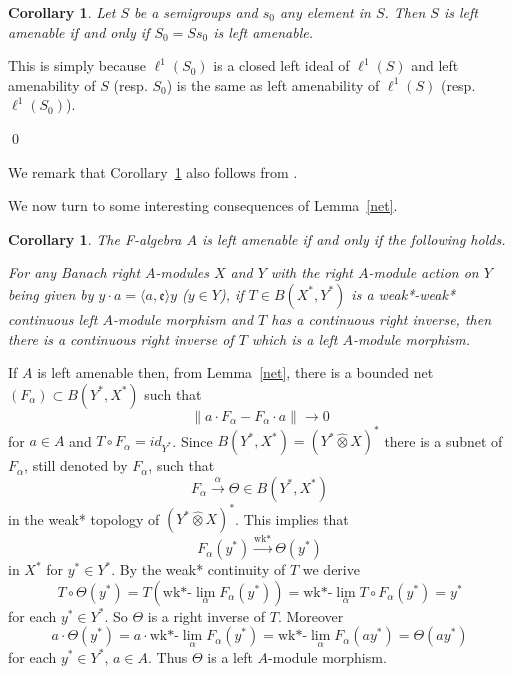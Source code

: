 \documentclass{tran-l}
\numberwithin{equation}{section}
\newtheorem{cor}[thm]{Corollary}
\theoremstyle{definition}
\theoremstyle{remark}
\begin{document}
\begin{cor}\label{Ss}
Let $S$ be a semigroups and $s_0$ any element in $S$. Then $S$ is left amenable if and only if $S_0=Ss_0$ is left amenable.
\end{cor}
\proof 
This is simply because $\ell^1(S_0)$ is a closed left ideal of $\ell^1(S)$ and left amenability of $S$ (resp. $S_0$) is the same as left amenability of $\ell^1(S)$ (resp. $\ell^1(S_0)$).

\qed

We remark that Corollary~\ref{Ss} also follows from \cite[Theorem~9]{Mitch 65}.

We now turn to some interesting consequences of Lemma~\ref{net}.

\begin{cor}\label{inverse}
The F-algebra $A$ is left amenable if and only if the following holds. 

For any Banach right $A$-modules $X$ and $Y$ with the right $A$-module action on $Y$ being given by $y\cdot a = \langle a,{\mathfrak{e}} \rangle y$ ($y\in Y$),  if $T\in B(X^*,Y^*)$ is a weak*-weak* continuous left $A$-module morphism and $T$ has a continuous right inverse, then there is a continuous right inverse of $T$ which is a left $A$-module morphism.
\end{cor}
\proof
If $A$ is left amenable then, from Lemma~\ref{net}, there is a bounded net $(F_{\alpha})\subset B(Y^*,X^*)$ such that 
\[
\|a\cdot F_{\alpha} - F_{\alpha}\cdot a\| \to 0
\]
 for $a\in A$
 and $T\circ F_{\alpha} =id_{Y^*}$. Since $B(Y^*,X^*) = (Y^*{\hat{\otimes}} X)^*$ there is a subnet of $F_{\alpha}$, still denoted by $F_{\alpha}$, such that 
 \[
 F_{\alpha} \overset{\alpha}{\to}  \Theta \in B(Y^*, X^*)
 \]
  in the weak* topology of $(Y^*{\hat{\otimes}} X)^*$. This implies that 
  \[
  F_{\alpha}(y^*) \overset{\text{wk*}}{\to}  \Theta(y^*)
  \]
   in $X^*$ for $y^*\in Y^*$. By the weak* continuity of $T$ we derive 
\[
T\circ  \Theta(y^*) = T(\text{wk*-}\lim_{\alpha} F_{\alpha}(y^*)) = \text{wk*-}\lim_{\alpha} T\circ F_{\alpha}(y^*) = y^*
\]
for each $y^*\in Y^*$. So $ \Theta$ is a right inverse of $T$. Moreover 
\[a\cdot  \Theta(y^*) = a\cdot \text{wk*-}\lim_{\alpha} F_{\alpha} (y^*) 
 = \text{wk*-}\lim_{\alpha} F_{\alpha} (ay^*) =  \Theta(ay^*)
\] 
for each $y^*\in Y^*$, $a\in  A$. Thus $ \Theta$ is a left $ A$-module morphism.
\end{document}
